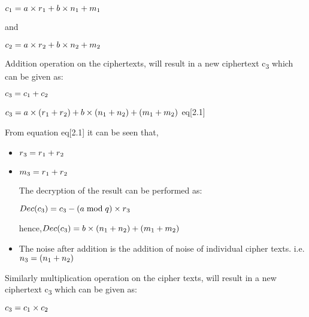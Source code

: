 \begin{itemize}
 \noindent\hspace{3cm} $c\textsubscript{1}=a\times r\textsubscript{1}+b\times n\textsubscript{1}  +m\textsubscript{1}$
 
 and 
 
 \noindent\hspace{3cm}$c\textsubscript{2}=a\times r\textsubscript{2}+b\times n\textsubscript{2}  +m\textsubscript{2}$
 
 \noindent Addition operation on the ciphertexts, will result in a new ciphertext c\textsubscript{3} which can be given as:

 \noindent\hspace{3cm} $c\textsubscript{3}=c\textsubscript{1}+c\textsubscript{2}$
 
 \noindent\hspace{3cm} $c\textsubscript{3}=a\times (r\textsubscript{1}+r\textsubscript{2})+b\times (n\textsubscript{1}+n\textsubscript{2}) +(m\textsubscript{1}+m\textsubscript{2})$  \hfill                                                                   eq[2.1]

 \noindent From equation eq[2.1] it can be seen that,
\begin{itemize}
\item
 \noindent $r\textsubscript{3}=r\textsubscript{1}+r\textsubscript{2}$
\item
 \noindent $m\textsubscript{3}= r\textsubscript{1}+ r\textsubscript{2}$

\vspace{0.25cm}
 \noindent The decryption of the result can be performed as:

 \noindent\hspace{3cm} $Dec(c\textsubscript{3})=c\textsubscript{3}-(a\bmod q)\times r\textsubscript{3}$
 
 \noindent hence,\hspace{2cm}$Dec(c\textsubscript{3})=b\times (n\textsubscript{1}+n\textsubscript{2}) +(m\textsubscript{1}+m\textsubscript{2})$
\item
The noise after addition is the  addition of noise of individual cipher texts. i.e. 
$n\textsubscript{3}=(n\textsubscript{1}+n\textsubscript{2})$
\end{itemize}

 \noindent Similarly multiplication operation on the cipher texts, will result in a new ciphertext c\textsubscript{3} which can be given as:
 
$c\textsubscript{3}=c\textsubscript{1}\times c\textsubscript{2}$


\end{itemize}
